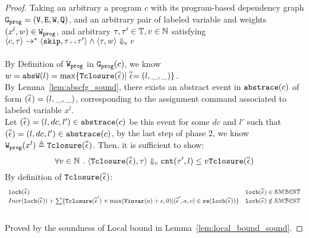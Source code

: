 \begin{proof}
  Taking an arbitrary a program ${c}$ with its program-based dependency graph $\progG = (\vertxs, \edges, \weights, \qflag)$, 
  and an arbitrary pair of labeled variable and weights $(x^l, w) \in \progW$, 
  and arbitrary $\vtrace, \trace' \in \mathbb{T},
  v \in \mathbb{N}$ satisfying
  \\
  $\config{{c}, \trace} \to^{*} \config{\eskip, \trace\tracecat\vtrace'} 
  \land 
  \config{\trace, w} \earrow v$
  \\
  \\
  By Definition of $\progW$ in $\progG(c)$, we know 
  $  w = \absW(l) = \max \{ \absclr(\absevent) | \absevent = (l, \_, \_)\}$.
  \\
  By Lemma~\ref{lem:abscfg_sound}, there exists an abstract event in $\absflow(c)$ of form $(\absevent) = (l, \_, \_)$,
  corresponding to the assignment command associated to labeled variable $x^l$. 
  \\
  Let $(\absevent) = (l, dc, l') \in \absflow(c)$ be this event for some $dc$ and $l'$ such that  $(\absevent) = (l, dc, l') \in \absflow(c)$,
  by the last step of phase 2, we know
  $
  \progW(x^l) 
  \triangleq \absclr(\absevent)
  $.
   Then, it is sufficient to show:
  \[
  \forall v \in \mathbb{N} \st 
  \config{\absclr(\absevent), \trace} \earrow 
  \vcounter(\vtrace', l) \leq v
  \absclr(\absevent)
  \]
  By definition of $\absclr(\absevent)$:
  \[
 \begin{array}{ll}
  \locbound(\absevent) & \locbound(\absevent) \in \constdom \\
  Incr(\locbound(\absevent)) + 
  \sum\{\absclr(\absevent') \times \max(\varinvar(a) + c, 0) | (\absevent', a, c) \in \reset(\locbound(\absevent))\} 
  & \locbound(\absevent) \notin \constdom
\end{array}
\]
  \caseL{$\locbound(\absevent) \in \constdom$}
  \\
  Proved by the soundness of Local bound in Lemma~\ref{lem:local_bound_sound}.
  \caseL{$\locbound(\absevent) \notin \constdom$}

\end{proof}

